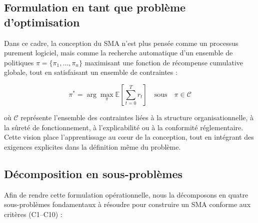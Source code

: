 \documentclass[ twoside,openright,titlepage,numbers=noenddot,headinclude,%
                footinclude=true,cleardoublepage=empty,abstractoff, %
                BCOR=5mm,paper=a4,fontsize=11pt,%
                french,american,%
                ]{scrreprt}
\begin{document}
\subsection{Formulation en tant que problème d'optimisation}

Dans ce cadre, la conception du SMA n'est plus pensée comme un processus purement logiciel, mais comme la recherche automatique d'un ensemble de politiques \(\pi = \{\pi_1, \dots, \pi_n\}\) maximisant une fonction de récompense cumulative globale, tout en satisfaisant un ensemble de contraintes :

\begin{equation}
\pi^* = \arg\max_{\pi} \mathbb{E}\left[\sum_{t=0}^{T} r_t\right] \quad \text{sous} \quad \pi \in \mathcal{C}
\end{equation}

où \(\mathcal{C}\) représente l'ensemble des contraintes liées à la structure organisationnelle, à la sûreté de fonctionnement, à l'explicabilité ou à la conformité réglementaire. Cette vision place l'apprentissage au cœur de la conception, tout en intégrant des exigences explicites dans la définition même du problème.

\subsection{Décomposition en sous-problèmes}

Afin de rendre cette formulation opérationnelle, nous la décomposons en quatre sous-problèmes fondamentaux à résoudre pour construire un SMA conforme aux critères (C1–C10) :
\end{document}
